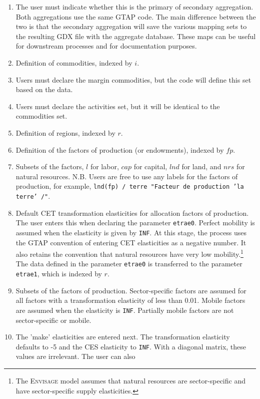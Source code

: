 \begin{enumerate}
\item The user must indicate whether this is the primary of secondary aggregation.
Both aggregations use the same GTAP code. The main difference between the two is
that the secondary aggregation will save the various mapping sets to the
resulting GDX file with the aggregate database. These maps can be useful
for downstream processes and for documentation purposes.
\item Definition of commodities, indexed by $i$.
\item Users must declare the margin commodities, but the code will
define this set based on the data.
\item Users must declare the activities set, but it will be identical
to the commodities set.
\item Definition of regions, indexed by $r$.
\item Definition of the factors of production (or endowments), indexed
by $\mathit{fp}$.
\item Subsets of the factors, $l$ for labor, $\mathit{cap}$ for
capital, $\mathit{lnd}$ for land, and $\mathit{nrs}$ for natural
resources. N.B. Users are free to use any labels for the factors of production,
for example, \texttt{lnd(fp) / terre "Facteur de production 'la terre' /"}.
\item Default CET transformation elasticities for allocation factors of production.
The user enters this when declaring the parameter \texttt{etrae0}. Perfect
mobility is assumed when the elasticity is given by \texttt{INF}. At this
stage, the process uses the GTAP convention of entering CET elasticities
as a negative number. It also retains the convention that natural resources
have very low mobility.\footnote{The \textsc{Envisage} model assumes
that natural resources are sector-specific and have sector-specific
supply elasticities.} The data defined in the parameter \texttt{etrae0}
is transferred to the parameter \texttt{etrae1}, which is indexed by $r$.
\item Subsets of the factors of production. Sector-specific factors
are assumed for all factors with a
transformation elasticity of less than 0.01. Mobile factors are
assumed when the elasticity is \texttt{INF}. Partially mobile
factors are not sector-specific or mobile.
\item The 'make' elasticities are entered next. The transformation
elasticity defaults to -5 and the CES elasticity to \texttt{INF}. With
a diagonal matrix, these values are irrelevant. The user can also

\end{enumerate}
